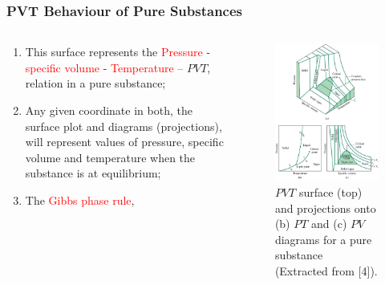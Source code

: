 \documentclass[10pt,compress]{beamer}
\begin{document}
\begin{frame}
 \frametitle{PVT Behaviour of Pure Substances}
 \begin{columns}
  \begin{column}[l]{0.5\linewidth}
    \begin{enumerate}\scriptsize
    \item <1-> This surface represents the \textcolor{red}{Pressure} - \textcolor{red}{specific volume} - \textcolor{red}{Temperature} -- $PVT$, relation in a pure substance;
    \item <2-> Any given coordinate in both, the surface plot and diagrams (projections), will represent values of pressure, specific volume and temperature when the substance is at equilibrium;
    \item <3-> The \textcolor{red}{Gibbs phase rule},
\end{enumerate}
  \end{column}
  \begin{column}[l]{0.5\linewidth}
   \begin{figure}%
    \begin{center}
     \includegraphics[width=4.cm,clip]{./Pics/PVT_Surface.jpg}
    \end{center}
    \scriptsize\caption{\scriptsize$PVT$ surface (top) and projections onto (b) $PT$ and (c) $PV$ diagrams for a pure substance (Extracted from [4]).}
   \end{figure}    
  \end{column}
 \end{columns}
\end{frame}
\end{document}
